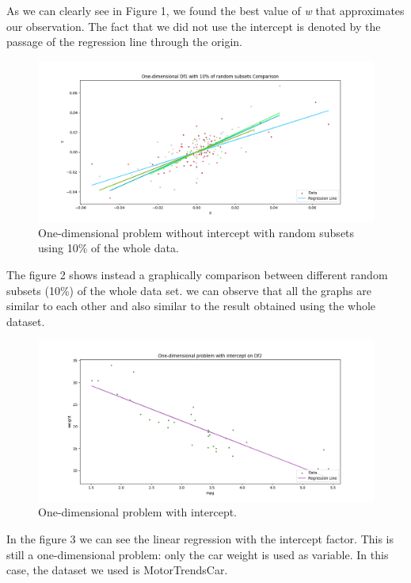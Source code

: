 \documentclass[10pt]{article}
\begin{document}
As we can clearly see in Figure 1, we found the best value of \textit{w} that approximates our observation. The fact that we did not use the intercept is denoted by the passage of the regression line through the origin.
\begin{figure}[h] 
	\centering
	\includegraphics[width=0.9\columnwidth]{Figure_2.png} %
	\caption{One-dimensional problem without intercept with random subsets using 10\% of the whole data.}
\end{figure}
\newpage
The figure 2 shows instead a graphically comparison between different random subsets (10\%) of the whole data set. we can observe that all the graphs are similar to each other and also similar to the result obtained using the whole dataset.

\begin{figure}[h] 
	\centering
	\includegraphics[width=1.0\columnwidth]{Figure_3.png} %
	\caption{One-dimensional problem with intercept.}
\end{figure}



In the figure 3 we can see the linear regression with the intercept factor. This is still a one-dimensional problem: only the car weight is used as variable. In this case, the dataset we used is MotorTrendsCar.
\end{document}
